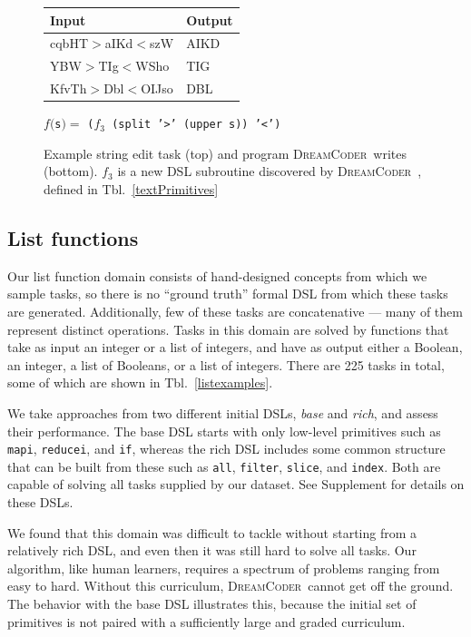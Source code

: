 \documentclass{article}
\newcommand{\system}{\textsc{DreamCoder}~}
\newcommand{\code}[1]{{\footnotesize\texttt{#1}}}
\begin{document}
\begin{figure}
  \centering\begin{tabular}{ll}\toprule
    Input&Output\\\midrule
cqbHT$>$aIKd$<$szW& 	AIKD\\
YBW$>$TIg$<$WSho 	&TIG\\
KfvTh$>$Dbl$<$OIJso 	&DBL
    \\\bottomrule
  \end{tabular}
  
  \vspace{0.25cm}
  
  \begin{minipage}{7.5cm}
 $f($\code{s}$) = $   \code{(}$f_3$\code{ (split '>' (upper s)) '<')}
    \end{minipage}
  \caption{Example string edit task (top) and program  \system writes (bottom). $f_3$ is a new DSL subroutine discovered by \system, defined in Tbl.~\ref{textPrimitives}}\label{exampleTextProblem}
  \end{figure}

\subsection{List functions}
Our list function domain consists of hand-designed concepts from which we
sample tasks, so there is no ``ground truth'' formal DSL from which these
tasks are generated. Additionally, few of these tasks are concatenative ---
many of them represent distinct operations.
Tasks in this domain are solved by functions that take as input an integer
or a list of integers, and have as output either a Boolean, an integer, a
list of Booleans, or a list of integers.  There are 225 tasks in total, some
of which are shown in Tbl.~\ref{listexamples}.

We take approaches from two different initial DSLs, \emph{base} and
\emph{rich}, and assess their performance. The base DSL starts with only
low-level primitives such as \code{mapi}, \code{reducei}, and
\code{if}, whereas the rich DSL includes some common structure that can be
built from these such as \code{all}, \code{filter}, \code{slice}, and
\code{index}.
Both are capable of solving all tasks supplied by our dataset.
See Supplement for details on these DSLs.

We found that this domain was difficult to tackle without starting from a
relatively rich DSL, and even then it was still hard to solve all tasks. Our
algorithm, like human learners, requires a spectrum of problems ranging from
easy to hard. Without this curriculum, \system cannot get off the ground.
The behavior with the base DSL illustrates this, because the initial set of
primitives is not paired with a sufficiently large and graded curriculum.
\end{document}
